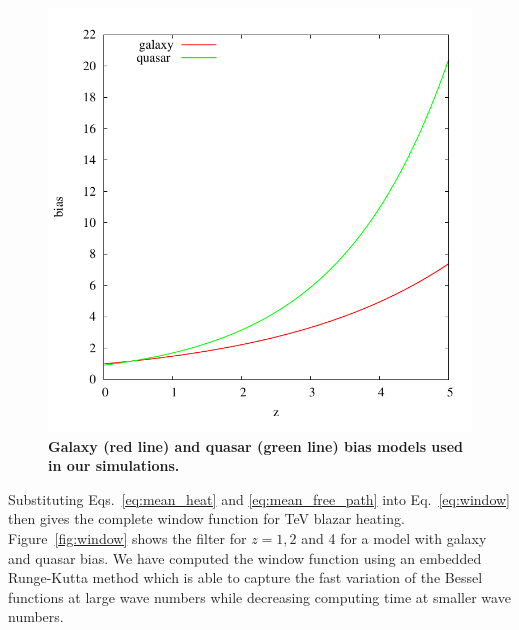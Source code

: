\documentclass[numberedappendix]{emulateapj}
\newcommand\ALc[1]{{\color{red} \bf #1}} %
\begin{document}
\begin{figure}[h]
\centering
\includegraphics[width = .4\textwidth ]{bias}
\caption{\ALc{Galaxy (red line) and quasar (green line) bias models used in our simulations.}}
\label{fig:bias}
\end{figure}

Substituting Eqs.~\eqref{eq:mean_heat} and \eqref{eq:mean_free_path} into Eq.~\eqref{eq:window} then gives the complete window function for TeV blazar heating. Figure~\ref{fig:window} shows the filter for $z=1,2$ and 4 for a model with galaxy and quasar bias. We have computed the window function using an embedded Runge-Kutta method which is able to capture the fast variation of the Bessel functions at large wave numbers while decreasing computing time at smaller wave numbers.
\end{document}
